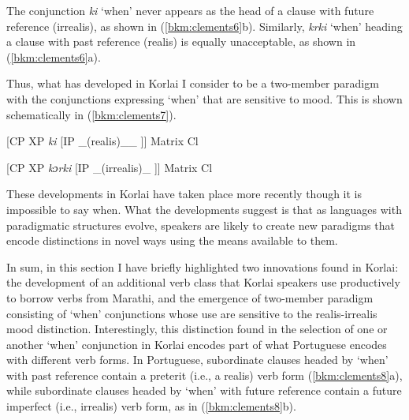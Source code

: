\documentclass[output=paper,colorlinks,citecolor=brown]{langscibook}
\begin{document}
The conjunction \textit{ki} `when' never appears as the head of a clause with future reference (irrealis), as shown in (\ref{bkm:clements6}b). Similarly, \textit{k\textopeno rki} `when' heading a clause with past reference (realis) is equally unacceptable, as shown in (\ref{bkm:clements6}a).

\ea{\label{bkm:clements6}}

\z
\z



\begin{sloppypar}
Thus, what has developed in Korlai I consider to be a two-member paradigm with the conjunctions expressing `when' that are sensitive to mood. This is shown schematically in (\ref{bkm:clements7}).
\end{sloppypar}

\ea{\label{bkm:clements7}}

 [CP  XP \textit{ki }        [IP \_(realis)\_\_ ]]  Matrix Cl\\{}

[CP  XP \textit{kɔrki}      [IP \_(irrealis)\_ ]] Matrix Cl

\z

These developments in Korlai have taken place more recently though it is impossible to say when. What the developments suggest is that as languages with paradigmatic structures evolve, speakers are likely to create new paradigms that encode distinctions in novel ways using the means available to them.

In sum, in this section I have briefly highlighted two innovations found in Korlai: the development of an additional verb class that Korlai speakers use productively to borrow verbs from Marathi, and the emergence of two-member paradigm consisting of `when' conjunctions whose use are sensitive to the realis-irrealis mood distinction.  Interestingly, this distinction found in the selection of one or another `when' conjunction in Korlai encodes part of what Portuguese encodes with different verb forms. In Portuguese, subordinate clauses headed by `when' with past reference contain a preterit (i.e., a realis) verb form (\ref{bkm:clements8}a), while subordinate clauses headed by `when' with future reference contain a future imperfect (i.e., irrealis) verb form, as in (\ref{bkm:clements8}b).
\end{document}
